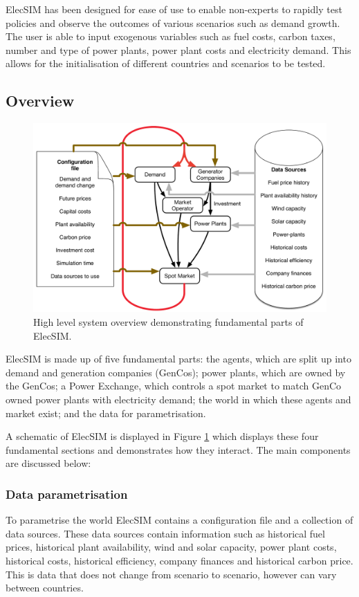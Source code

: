 
ElecSIM has been designed for ease of use to enable non-experts to rapidly test policies and observe the outcomes of various scenarios such as demand growth. The user is able to input exogenous variables such as fuel costs, carbon taxes, number and type of power plants, power plant costs and electricity demand. This allows for the initialisation of different countries and scenarios to be tested.


\subsection{Overview}

\begin{figure}[b]
	\centering
	\includegraphics[width=0.97\linewidth]{figures/System_overview}
	\caption{High level system overview demonstrating fundamental parts of ElecSIM.}
	\label{fig:systemoverview}
\end{figure}




ElecSIM is made up of five fundamental parts: the agents, which are split up into demand and generation companies (GenCos); power plants, which are owned by the GenCos; a Power Exchange, which controls a spot market to match GenCo owned power plants with electricity demand; the world in which these agents and market exist; and the data for parametrisation.

A schematic of ElecSIM is displayed in Figure \ref{fig:systemoverview} which displays these four fundamental sections and demonstrates how they interact. The main components are discussed below:

\subsubsection{Data parametrisation} To parametrise the world ElecSIM contains a configuration file and a collection of data sources. These data sources contain information such as historical fuel prices, historical plant availability, wind and solar capacity, power plant costs, historical costs, historical efficiency, company finances and historical carbon price. This is data that does not change from scenario to scenario, however can vary between countries.

